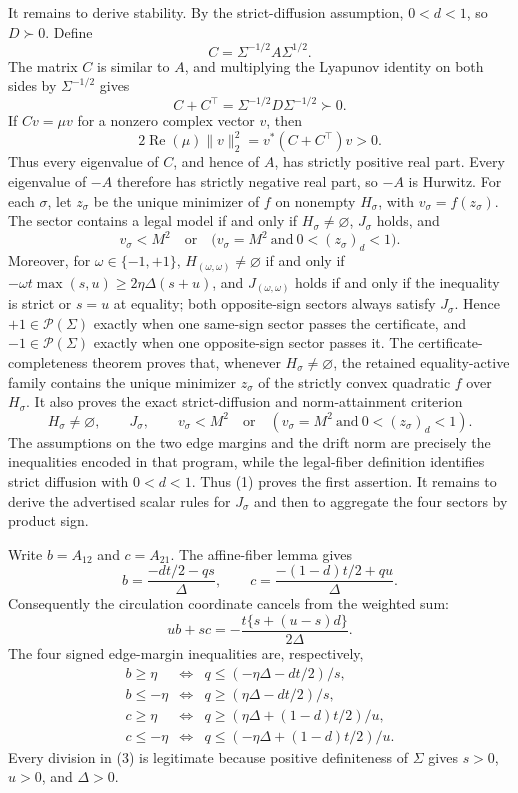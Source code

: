 It remains to derive stability. By the strict-diffusion assumption, \(0<d<1\), so \(D\succ0\). Define
\[
C=\Sigma^{-1/2}A\Sigma^{1/2}.
\]
The matrix \(C\) is similar to \(A\), and multiplying the Lyapunov identity on both sides by \(\Sigma^{-1/2}\) gives
\[
C+C^{\top}=\Sigma^{-1/2}D\Sigma^{-1/2}\succ0.
\]
If \(Cv=\mu v\) for a nonzero complex vector \(v\), then
\[
2\operatorname{Re}(\mu)\lVert v\rVert_2^2
=v^*(C+C^{\top})v>0.
\]
Thus every eigenvalue of \(C\), and hence of \(A\), has strictly positive real part. Every eigenvalue of \(-A\) therefore has strictly negative real part, so \(-A\) is Hurwitz.
For each \(\sigma\), let \(z_{\sigma}\) be the unique minimizer of \(f\) on nonempty \(H_{\sigma}\), with \(v_{\sigma}=f(z_{\sigma})\). The sector contains a legal model if and only if \(H_{\sigma}\ne\varnothing\), \(J_{\sigma}\) holds, and
\[
v_{\sigma}<M^2\quad\text{or}\quad\bigl(v_{\sigma}=M^2\ \text{and}\ 0<(z_{\sigma})_d<1\bigr).
\]
Moreover, for \(\omega\in\{-1,+1\}\), \(H_{(\omega,\omega)}\ne\varnothing\) if and only if \(-\omega t\max(s,u)\ge2\eta\Delta(s+u)\), and \(J_{(\omega,\omega)}\) holds if and only if the inequality is strict or \(s=u\) at equality; both opposite-sign sectors always satisfy \(J_{\sigma}\). Hence \(+1\in\mathcal P(\Sigma)\) exactly when one same-sign sector passes the certificate, and \(-1\in\mathcal P(\Sigma)\) exactly when one opposite-sign sector passes it.
The certificate-completeness theorem proves that, whenever \(H_{\sigma}\ne\varnothing\), the retained equality-active family contains the unique minimizer \(z_{\sigma}\) of the strictly convex quadratic \(f\) over \(H_{\sigma}\). It also proves the exact strict-diffusion and norm-attainment criterion
\[
H_{\sigma}\ne\varnothing,\qquad
J_{\sigma},\qquad
v_{\sigma}<M^2
\quad\text{or}\quad
\left(v_{\sigma}=M^2\ \text{and}\ 0<(z_{\sigma})_d<1\right). \tag{1}
\]
The assumptions on the two edge margins and the drift norm are precisely the inequalities encoded in that program, while the legal-fiber definition identifies strict diffusion with \(0<d<1\). Thus (1) proves the first assertion. It remains to derive the advertised scalar rules for \(J_{\sigma}\) and then to aggregate the four sectors by product sign.

Write \(b=A_{12}\) and \(c=A_{21}\). The affine-fiber lemma gives
\[
b=\frac{-dt/2-qs}{\Delta},
\qquad
c=\frac{-(1-d)t/2+qu}{\Delta}.
\]
Consequently the circulation coordinate cancels from the weighted sum:
\[
ub+sc
=-\frac{t\{s+(u-s)d\}}{2\Delta}. \tag{2}
\]
The four signed edge-margin inequalities are, respectively,
\[
\begin{array}{lll}
b\ge\eta &\Longleftrightarrow& q\le(-\eta\Delta-dt/2)/s,\\
b\le-\eta&\Longleftrightarrow& q\ge(\eta\Delta-dt/2)/s,\\
c\ge\eta &\Longleftrightarrow& q\ge(\eta\Delta+(1-d)t/2)/u,\\
c\le-\eta&\Longleftrightarrow& q\le(-\eta\Delta+(1-d)t/2)/u.
\end{array} \tag{3}
\]
Every division in (3) is legitimate because positive definiteness of \(\Sigma\) gives \(s>0\), \(u>0\), and \(\Delta>0\).


